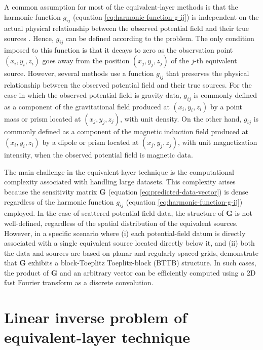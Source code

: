\documentclass[utf8]{FrontiersinHarvard} %
\begin{document}
	A common assumption for most of the equivalent-layer methods is that the harmonic function $g_{ij}$ 
	(equation \ref{eq:harmonic-function-g-ij}) is independent on the actual physical relationship between the
	observed potential field and their true sources \cite[e.g.,][]{cordell1992, guspi-novara2009,li_etal_2014}.
	Hence, $g_{ij}$ can be defined according to the problem.
	The only condition imposed to this function is that it decays to zero as the observation point $(x_{i}, y_{i}, z_{i})$
	goes away from the position $(x_{j}, y_{j}, z_{j})$ of the $j$-th equivalent source.
	However, several methods use a function $g_{ij}$ that preserves the physical relationship between the
	observed potential field and their true sources.
	For the case in which the observed potential field is gravity data, $g_{ij}$ is commonly defined as a component of 
	the gravitational field produced at $(x_{i}, y_{i}, z_{i})$ by a point mass or prism located at $(x_{j}, y_{j}, z_{j})$, with unit density.
	On the other hand, $g_{ij}$ is commonly defined as a component of the 
	magnetic induction field produced at $(x_{i}, y_{i}, z_{i})$ by a dipole or prism located at $(x_{j}, y_{j}, z_{j})$,
	with unit magnetization intensity, when the observed potential field is magnetic data.
	
	The main challenge in the equivalent-layer technique is the computational complexity associated with handling large datasets. 
	This complexity arises because the sensitivity matrix $\mathbf{G}$ (equation \ref{eq:predicted-data-vector}) is dense regardless of the 
	harmonic function $g_{ij}$ (equation \ref{eq:harmonic-function-g-ij}) employed. 
	In the case of scattered potential-field data, the structure of $\mathbf{G}$  is not well-defined, regardless of the spatial distribution 
	of the equivalent sources.
	However, in a specific scenario where (i) each potential-field datum is directly associated with a single equivalent source located directly below it, 
	and (ii) both the data and sources are based on planar and regularly spaced grids,  \citet{takahashi-etal2020,takahashi-etal2022} demonstrate that 
	$\mathbf{G}$ exhibits a block-Toeplitz Toeplitz-block (BTTB) structure. 
	In such cases, the product of $\mathbf{G}$ and an arbitrary vector can be efficiently computed using a 2D fast Fourier transform as a discrete convolution.
	
	\section{Linear inverse problem of equivalent-layer technique}
	\label{sec:linear-inverse-problem}
	
\end{document}

